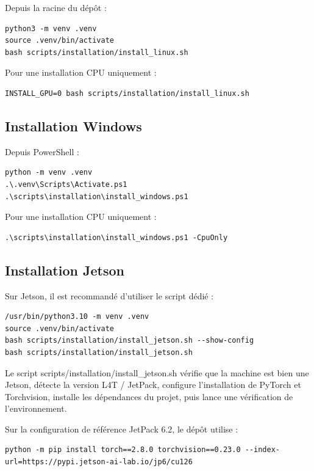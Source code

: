\documentclass[11pt,letterpaper]{article}
\begin{document}
Depuis la racine du dépôt :

\begin{verbatim}
python3 -m venv .venv
source .venv/bin/activate
bash scripts/installation/install_linux.sh
\end{verbatim}

Pour une installation CPU uniquement :

\begin{verbatim}
INSTALL_GPU=0 bash scripts/installation/install_linux.sh
\end{verbatim}

\subsection{Installation Windows}

Depuis PowerShell :

\begin{verbatim}
python -m venv .venv
.\.venv\Scripts\Activate.ps1
.\scripts\installation\install_windows.ps1
\end{verbatim}

Pour une installation CPU uniquement :

\begin{verbatim}
.\scripts\installation\install_windows.ps1 -CpuOnly
\end{verbatim}

\subsection{Installation Jetson}

Sur Jetson, il est recommandé d’utiliser le script dédié :

\begin{verbatim}
/usr/bin/python3.10 -m venv .venv
source .venv/bin/activate
bash scripts/installation/install_jetson.sh --show-config
bash scripts/installation/install_jetson.sh
\end{verbatim}

Le script scripts/installation/install\_jetson.sh vérifie que la machine est bien une Jetson, détecte la version L4T / JetPack, configure l’installation de PyTorch et Torchvision, installe les dépendances du projet, puis lance une vérification de l’environnement.

Sur la configuration de référence JetPack 6.2, le dépôt utilise :

\begingroup
\scriptsize
\begin{verbatim}
python -m pip install torch==2.8.0 torchvision==0.23.0 --index-url=https://pypi.jetson-ai-lab.io/jp6/cu126
\end{verbatim}
\endgroup
\end{document}

